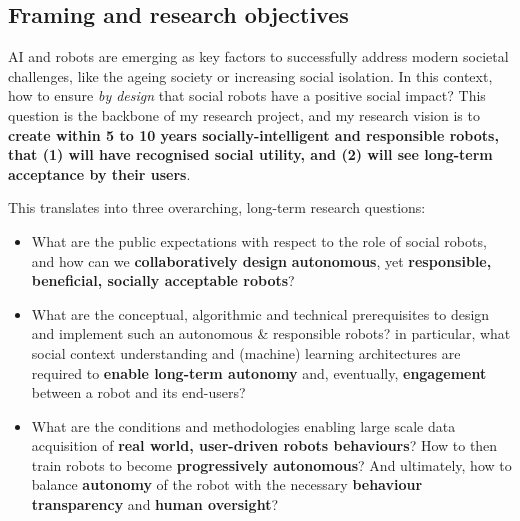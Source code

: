 \subsection{Framing and research objectives}

AI and robots are emerging as key factors to successfully address modern societal
challenges, like the ageing society or increasing social isolation. In this context, how to
ensure \emph{by design} that social robots have a positive social impact?
This question is the backbone of my research project, and my research vision
is to \textbf{create within 5 to 10 years socially-intelligent and responsible robots,
that (1) will have recognised social utility, and (2) will see long-term
acceptance by their users}.
%

\vspace{0.4em}



This translates into three overarching, long-term research questions:

\vspace{0.5em}
\begin{itemize}
    \item What are the public expectations with respect to the role of social
        robots, and how can we \textbf{collaboratively design}
        \textbf{autonomous}, yet \textbf{responsible, beneficial, socially
        acceptable robots}?

    \item What are the conceptual, algorithmic and technical prerequisites to
        design and implement such an autonomous \& responsible robots? in
        particular, what social context understanding and (machine) learning
        architectures are required to \textbf{enable long-term autonomy} and,
        eventually, \textbf{engagement} between a robot and its end-users?

    \item What are the conditions and methodologies enabling large scale data
        acquisition of \textbf{real world, user-driven robots behaviours}? How
        to then train robots to become \textbf{progressively autonomous}?  And
        ultimately, how to balance \textbf{autonomy} of the robot with the
        necessary \textbf{behaviour transparency} and \textbf{human oversight}?

\end{itemize}

